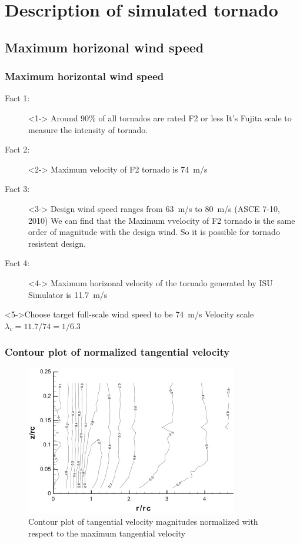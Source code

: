 \documentclass{beamer}
\begin{document}
\section{Description of simulated tornado}
\subsection{Maximum horizonal wind speed}

\begin{frame}
	\frametitle{Maximum horizontal wind speed}
	\begin{description}
		\item[Fact 1:  ]<1-> Around 90\% of all tornados are rated F2 or less
			 {It's Fujita scale to measure the intensity of tornado.}
		\item[Fact 2: ]<2-> Maximum velocity of F2 tornado is \alert{\SI{74}{m/s}}
		\item[Fact 3: ]<3-> Design wind speed ranges from \alert{\SI{63}{m/s}} to \alert{\SI{80}{m/s}} (ASCE 7-10, 2010)
			 {We can find that the Maximum vvelocity of F2 tornado is the same order of magnitude with the design wind. So it is possible for tornado resistent design.}
		\item[Fact 4: ]<4-> Maximum horizonal velocity of the tornado generated by ISU Simulator is \alert{\SI{11.7}{m/s}}
	\end{description}
	\begin{block}<5->{Choose target full-scale wind speed to be \alert{\SI{74}{m/s}}}
			 Velocity scale $\lambda_v=11.7/74=1/6.3$
	\end{block} 
\end{frame}

\begin{frame}
	\frametitle{Contour plot of normalized tangential velocity}
	\begin{figure}
	\centering
	\caption{Contour plot of tangential velocity magnitudes normalized with respect to the maximum tangential velocity}
	\includegraphics{./fig/1.jpg}
	\end{figure}

\end{frame}
\end{document}
